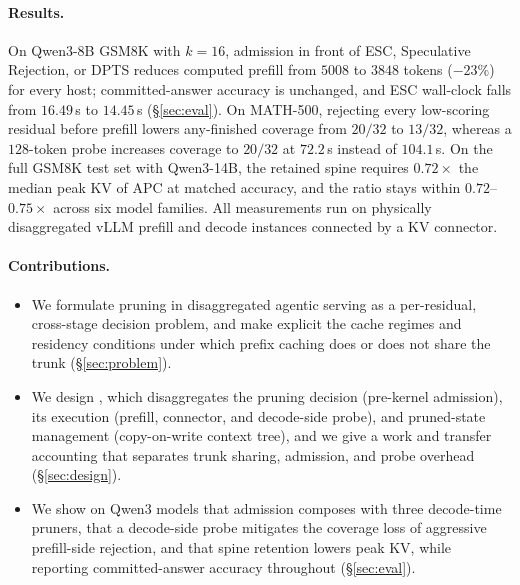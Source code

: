 \paragraph{Results.}
On Qwen3-8B GSM8K with $k{=}16$, admission in front of ESC, Speculative Rejection, or DPTS reduces computed prefill from $5008$ to $3848$ tokens ($-23\%$) for every host; committed-answer accuracy is unchanged, and ESC wall-clock falls from $16.49$\,s to $14.45$\,s (\S\ref{sec:eval}).
On MATH-500, rejecting every low-scoring residual before prefill lowers any-finished coverage from $20/32$ to $13/32$, whereas a $128$-token probe increases coverage to $20/32$ at $72.2$\,s instead of $104.1$\,s.
On the full GSM8K test set with Qwen3-14B, the retained spine requires $0.72\times$ the median peak KV of APC at matched accuracy, and the ratio stays within $0.72$--$0.75\times$ across six model families.
All measurements run on physically disaggregated vLLM prefill and decode instances connected by a KV connector.

\paragraph{Contributions.}
\begin{itemize}[leftmargin=*,itemsep=1pt,topsep=2pt]
\item We formulate pruning in disaggregated agentic serving as a per-residual, cross-stage decision problem, and make explicit the cache regimes and residency conditions under which prefix caching does or does not share the trunk (\S\ref{sec:problem}).
\item We design \sys, which disaggregates the pruning decision (pre-kernel admission), its execution (prefill, connector, and decode-side probe), and pruned-state management (copy-on-write context tree), and we give a work and transfer accounting that separates trunk sharing, admission, and probe overhead (\S\ref{sec:design}).
\item We show on Qwen3 models that admission composes with three decode-time pruners, that a decode-side probe mitigates the coverage loss of aggressive prefill-side rejection, and that spine retention lowers peak KV, while reporting committed-answer accuracy throughout (\S\ref{sec:eval}).
\end{itemize}
